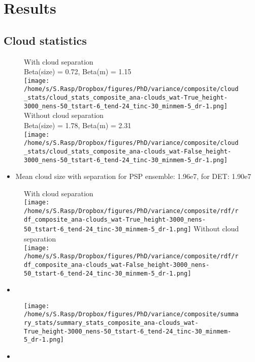 \documentclass[a4paper, 12pt]{article}
\begin{document}
\newpage


\section{Results}

\subsection{Cloud statistics}
\begin{figure}[h!]
\noindent \centering
With cloud separation\\
Beta(size) = 0.72, Beta(m) = 1.15\\
\texttt{[image: /home/s/S.Rasp/Dropbox/figures/PhD/variance/composite/cloud\_stats/cloud\_stats\_composite\_ana-clouds\_wat-True\_height-3000\_nens-50\_tstart-6\_tend-24\_tinc-30\_minmem-5\_dr-1.png]}
Without cloud separation\\
Beta(size) = 1.78, Beta(m) = 2.31\\
\texttt{[image: /home/s/S.Rasp/Dropbox/figures/PhD/variance/composite/cloud\_stats/cloud\_stats\_composite\_ana-clouds\_wat-False\_height-3000\_nens-50\_tstart-6\_tend-24\_tinc-30\_minmem-5\_dr-1.png]}
\caption{}
\end{figure}
\begin{itemize}
 \item Mean cloud size with separation for PSP ensemble: 1.96e7, for DET: 1.90e7
\end{itemize}
\newpage



\begin{figure}[h!]
\noindent \centering
With cloud separation\\
\texttt{[image: /home/s/S.Rasp/Dropbox/figures/PhD/variance/composite/rdf/rdf\_composite\_ana-clouds\_wat-True\_height-3000\_nens-50\_tstart-6\_tend-24\_tinc-30\_minmem-5\_dr-1.png]}
Without cloud separation\\
\texttt{[image: /home/s/S.Rasp/Dropbox/figures/PhD/variance/composite/rdf/rdf\_composite\_ana-clouds\_wat-False\_height-3000\_nens-50\_tstart-6\_tend-24\_tinc-30\_minmem-5\_dr-1.png]}
\end{figure}
\begin{itemize}
 \item 
\end{itemize}
\newpage

\begin{figure}[h!]
\noindent \centering
\texttt{[image: /home/s/S.Rasp/Dropbox/figures/PhD/variance/composite/summary\_stats/summary\_stats\_composite\_ana-clouds\_wat-True\_height-3000\_nens-50\_tstart-6\_tend-24\_tinc-30\_minmem-5\_dr-1.png]}
\end{figure}
\begin{itemize}
 \item 
\end{itemize}
\newpage
\end{document}

